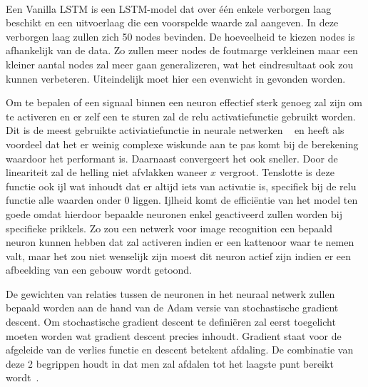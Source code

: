\paragraph{}

Een Vanilla LSTM is een LSTM-model dat over \'{e}\'{e}n enkele verborgen laag beschikt en een uitvoerlaag die een voorspelde waarde zal aangeven. In deze verborgen laag zullen zich 50 nodes bevinden. De hoeveelheid te kiezen nodes is afhankelijk van de data. Zo zullen meer nodes de foutmarge verkleinen maar een kleiner aantal nodes zal meer gaan generalizeren, wat het eindresultaat ook zou kunnen verbeteren. Uiteindelijk moet hier een evenwicht in gevonden worden.

Om te bepalen of een signaal binnen een neuron effectief sterk genoeg zal zijn om te activeren en er zelf een te sturen zal de relu activatiefunctie gebruikt worden. Dit is de meest gebruikte activiatiefunctie in neurale netwerken ~\autocite{Liu2017} en heeft als voordeel dat het er weinig complexe wiskunde aan te pas komt bij de berekening waardoor het performant is. Daarnaast convergeert het ook sneller. Door de lineariteit zal de helling niet afvlakken waneer $x$ vergroot. Tenslotte is deze functie ook ijl wat inhoudt dat er altijd iets van activatie is, specifiek bij de relu functie alle waarden onder 0 liggen. Ijlheid komt de effici\"{e}ntie van het model ten goede omdat hierdoor bepaalde neuronen enkel geactiveerd zullen worden bij specifieke prikkels. Zo zou een netwerk voor image recognition een bepaald neuron kunnen hebben dat zal activeren indien er een kattenoor waar te nemen valt, maar het zou niet wenselijk zijn moest dit neuron actief zijn indien er een afbeelding van een gebouw wordt getoond.   

De gewichten van relaties tussen de neuronen in het neuraal netwerk zullen bepaald worden aan de hand van de Adam versie van stochastische gradient descent. Om stochastische gradient descent te defini\"{e}ren zal eerst toegelicht moeten worden wat gradient descent precies inhoudt. Gradient staat voor de afgeleide van de verlies functie en descent betekent afdaling. De combinatie van deze 2 begrippen houdt in dat men zal afdalen tot het laagste punt bereikt wordt~\autocite{Srinivasan2019}.


